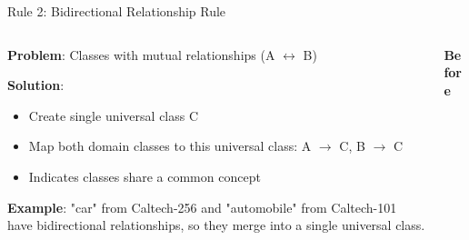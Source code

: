 \documentclass[aspectratio=169]{beamer}
\begin{document}
\begin{frame}{Rule 2: Bidirectional Relationship Rule}
    \begin{columns}[T]
        \begin{column}{0.55\textwidth}
            \textbf{Problem}: Classes with mutual relationships (A $\leftrightarrow$ B)

            \vspace{0.5em}

            \textbf{Solution}:
            \begin{itemize}
                \item Create single universal class C
                \item Map both domain classes to this universal class: A $\rightarrow$ C, B $\rightarrow$ C
                \item Indicates classes share a common concept
            \end{itemize}

            \vspace{0.5em}

            \textbf{Example}: "car" from Caltech-256 and "automobile" from Caltech-101 have bidirectional relationships, so they merge into a single universal class.
        \end{column}

        \begin{column}{0.4\textwidth}
            \begin{center}
                \textbf{Before} \\
                \vspace{0.5em}

                \vspace{1em}


\end{center}
\end{column}
\end{columns}
\end{frame}
\end{document}
